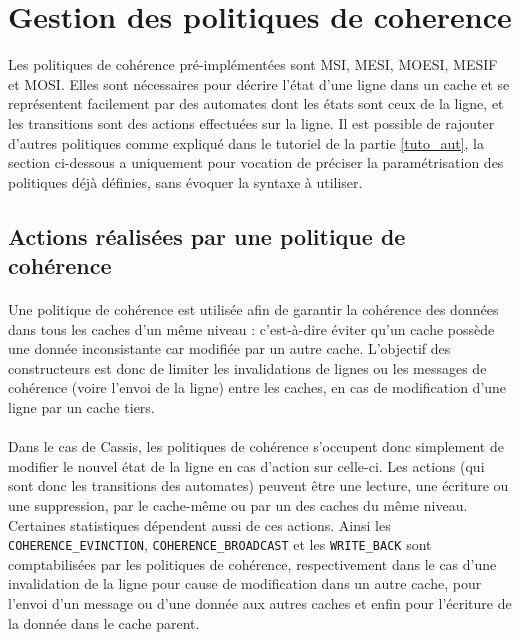 \section{Gestion des politiques de coherence}

Les politiques de cohérence pré-implémentées sont MSI, MESI, MOESI, MESIF et MOSI. Elles sont nécessaires pour décrire l'état d'une ligne dans un cache et se représentent facilement par des automates dont les états sont ceux de la ligne, et les transitions sont des actions effectuées sur la ligne. Il est possible de rajouter d'autres politiques comme expliqué dans le tutoriel de la partie \ref{tuto_aut}, la section ci-dessous a uniquement pour vocation de préciser la paramétrisation des politiques déjà définies, sans évoquer la syntaxe à utiliser.

\subsection{Actions réalisées par une politique de cohérence}
\label{actions}

\paragraph{}
Une politique de cohérence est utilisée afin de garantir la cohérence des données dans tous les caches d'un même niveau : c'est-à-dire éviter qu'un cache possède une donnée inconsistante car modifiée par un autre cache. L'objectif des constructeurs est donc de limiter les invalidations de lignes ou les messages de cohérence (voire l'envoi de la ligne) entre les caches, en cas de modification d'une ligne par un cache tiers. 

\paragraph{}
Dans le cas de \textsf{Cassis}, les politiques de cohérence s'occupent donc simplement de modifier le nouvel état de la ligne en cas d'action sur celle-ci. Les actions (qui sont donc les transitions des automates) peuvent être une lecture, une écriture ou une suppression, par le cache-même ou par un des caches du même niveau. Certaines statistiques dépendent aussi de ces actions. Ainsi les \verb!COHERENCE_EVINCTION!, \verb!COHERENCE_BROADCAST! et les \verb!WRITE_BACK! sont comptabilisées par les politiques de cohérence, respectivement dans le cas d'une invalidation de la ligne pour cause de modification dans un autre cache, pour l'envoi d'un message ou d'une donnée aux autres caches et enfin pour l'écriture de la donnée dans le cache parent. 

